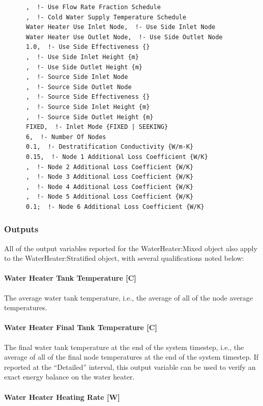 \begin{lstlisting}
      ,  !- Use Flow Rate Fraction Schedule
      ,  !- Cold Water Supply Temperature Schedule
      Water Heater Use Inlet Node,  !- Use Side Inlet Node
      Water Heater Use Outlet Node,  !- Use Side Outlet Node
      1.0,  !- Use Side Effectiveness {}
      ,  !- Use Side Inlet Height {m}
      ,  !- Use Side Outlet Height {m}
      ,  !- Source Side Inlet Node
      ,  !- Source Side Outlet Node
      ,  !- Source Side Effectiveness {}
      ,  !- Source Side Inlet Height {m}
      ,  !- Source Side Outlet Height {m}
      FIXED,  !- Inlet Mode {FIXED | SEEKING}
      6,  !- Number Of Nodes
      0.1,  !- Destratification Conductivity {W/m-K}
      0.15,  !- Node 1 Additional Loss Coefficient {W/K}
      ,  !- Node 2 Additional Loss Coefficient {W/K}
      ,  !- Node 3 Additional Loss Coefficient {W/K}
      ,  !- Node 4 Additional Loss Coefficient {W/K}
      ,  !- Node 5 Additional Loss Coefficient {W/K}
      0.1;  !- Node 6 Additional Loss Coefficient {W/K}
\end{lstlisting}

\subsubsection{Outputs}\label{outputs-1-030}

All of the output variables reported for the WaterHeater:Mixed object also apply to the WaterHeater:Stratified object, with several qualifications noted below:

\paragraph{Water Heater Tank Temperature {[}C{]}}\label{water-heater-tank-temperature-c-1}

The average water tank temperature, i.e., the average of all of the node average temperatures.

\paragraph{Water Heater Final Tank Temperature {[}C{]}}\label{water-heater-final-tank-temperature-c-1}

The final water tank temperature at the end of the system timestep, i.e., the average of all of the final node temperatures at the end of the system timestep. If reported at the ``Detailed'' interval, this output variable can be used to verify an exact energy balance on the water heater.

\paragraph{Water Heater Heating Rate {[}W{]}}\label{water-heater-heating-rate-w-1}

